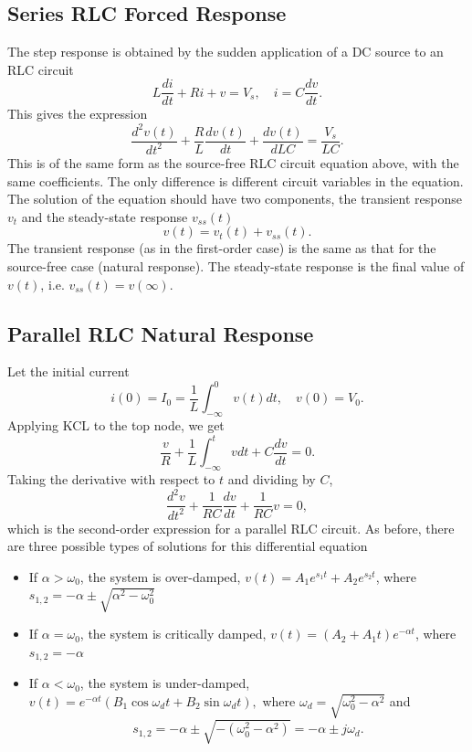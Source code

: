\documentclass{article}
\begin{document}
\subsection{Series RLC Forced Response}
The step response is obtained by the sudden application of a DC source to an RLC circuit 
\[
    L \frac{d i}{d t}+Ri+v=V_s,\quad i=C \frac{d v}{d t}.
\]
This gives the expression 
\[
    \frac{d^2v(t)}{d t^2}+\frac{R}{L}\frac{d v(t)}{d t}+\frac{d v(t)}{d LC}=\frac{V_s}{LC}.
\]
This is of the same form as the source-free RLC circuit equation above, with the same coefficients. The only difference is different circuit variables in the equation. The solution of the equation should have two components, the transient response $v_t$ and the steady-state response $v_{ss}(t)$ 
\[
    v(t)=v_t(t)+v_{ss}(t).
\]
The transient response (as in the first-order case) is the same as that for the source-free case (natural response). The steady-state response is the final value of $v(t)$, i.e. $v_{ss}(t)=v(\infty)$.

\subsection{Parallel RLC Natural Response}
Let the initial current 
\[
    i(0)=I_0=\frac{1}{L}\int_{-\infty}^0v(t)dt, \quad v(0)=V_0.
\]
Applying KCL to the top node, we get 
\[
    \frac{v}{R}+\frac{1}{L}\int_{-\infty}^tvdt+C \frac{d v}{d t}=0.
\]
Taking the derivative with respect to $t$ and dividing by $C$, 
\[
    \frac{d^2v}{d t^2}+\frac{1}{RC}\frac{dv}{dt}+\frac{1}{RC}v=0,
\]
which is the second-order expression for a parallel RLC circuit. As before, there are three possible types of solutions for this differential equation 
\begin{itemize}
    \item If $\alpha >\omega _0$, the system is over-damped, $v(t)=A_1e^{s_1t}+A_2e^{s_2t}$, where $s_{1,2}=-\alpha \pm\sqrt{\alpha^2-\omega^2_0}$
    \item If $\alpha =\omega _0$, the system is critically damped, $v(t)=\left( A_2+A_1t \right)e^{-\alpha t}$, where $s_{1,2}=-\alpha $
    \item If $\alpha <\omega _0$, the system is under-damped, $v(t)=e^{-\alpha t}\left( B_1\cos\omega _dt+B_2\sin\omega _dt \right),$ where $\omega _d=\sqrt{\omega _0^2-\alpha ^2}$ and 
    \[
        s_{1,2}=-\alpha \pm \sqrt{-\left( \omega _0^2-\alpha ^2 \right)}=-\alpha \pm j\omega _d.
    \]
\end{itemize}
\end{document}

